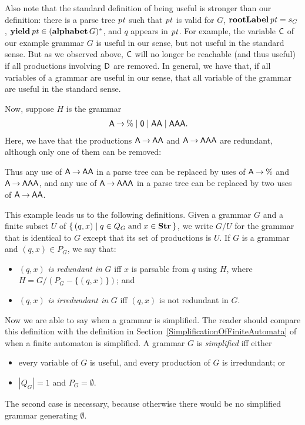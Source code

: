 Also note that the standard definition of being useful is stronger
than our definition: there is a parse tree ${\it pt}$ such that ${\it pt}$ is
valid for $G$, $\mathbf{rootLabel}\,{\it pt}=s_G$, $\mathbf{yield}\,{\it pt}\in
(\mathbf{alphabet}\,G)^*$, and $q$ appears in ${\it pt}$.  For example, the
variable $\mathsf{C}$ of our example grammar $G$ is useful in our sense, but
not useful in the standard sense.  But as we observed above, $\mathsf{C}$
will no longer be reachable (and thus useful) if all productions
involving $\mathsf{D}$ are removed.  In general, we have that, if all
variables of a grammar are useful in our sense, that all variable of
the grammar are useful in the standard sense.

Now, suppose $H$ is the grammar
\begin{align*}
\mathsf{A} &\mathbin{\to} \% \mid \mathsf{0} \mid \mathsf{AA} \mid \mathsf{AAA} .
\end{align*}
Here, we have that the productions $\mathsf{A}\mathbin{\to}\mathsf{AA}$ and
$\mathsf{A}\mathbin{\to}\mathsf{AAA}$ are redundant, although only one of them can be
removed:
\begin{center}
  
\end{center}
Thus any use of $\mathsf{A}\mathbin{\to}\mathsf{AA}$ in a parse tree can be replaced
by uses of $\mathsf{A}\mathbin{\to}\%$ and $\mathsf{A}\mathbin{\to}\mathsf{AAA}$, and any use of
$\mathsf{A}\mathbin{\to}\mathsf{AAA}$ in a parse tree can be replaced by two uses
of $\mathsf{A}\mathbin{\to}\mathsf{AA}$.

This example leads us to the following definitions.  Given a grammar
$G$ and a finite subset $U$ of $\{ \, (q,x) \mid q\in Q_G\;\allowbreak\mbox{and}\allowbreak\;
  x\in\mathbf{Str} \, \}$, we write $G/U$ for the grammar that is identical to $G$
except that its set of productions is $U$.
If $G$ is a grammar and $(q,x)\in P_G$, we say that:
\begin{itemize}
\item $(q,x)$ \emph{is redundant in} $G$ iff $x$ is parsable from $q$
%
 using $H$, where $H=G/(P_G - \{(q,x)\})$; and

\item $(q,x)$ \emph{is irredundant in} $G$ iff $(q,x)$ is not
%
  redundant in $G$.
\end{itemize}

Now we are able to say when a grammar is simplified.  The reader
should compare this definition with the definition in
Section~\ref{SimplificationOfFiniteAutomata} of when a finite
automaton is simplified.
%
A grammar $G$ is \emph{simplified} iff either
\begin{itemize}
\item every variable of $G$ is useful, and every production of $G$
  is irredundant; or

\item $|Q_G|=1$ and $P_G = \emptyset$.
\end{itemize}
The second case is necessary, because otherwise there would be
no simplified grammar generating $\emptyset$.

